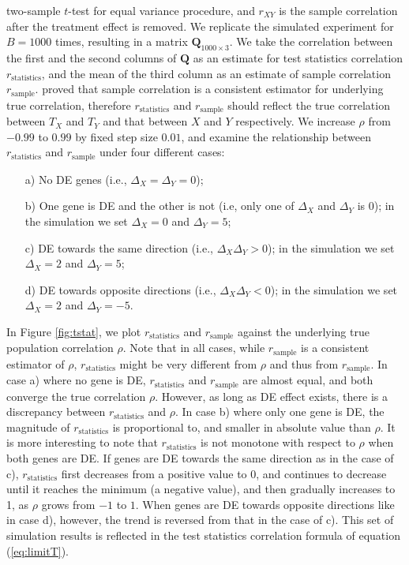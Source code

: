 \documentclass[12pt, a4paper]{article}
\begin{document}
	two-sample $t$-test for equal variance procedure, and $r_{XY}$ is the sample correlation after the treatment effect is removed. We replicate the simulated
	experiment for $B=1000$ times, resulting in a matrix $\bm Q_{1000\times 3}$. We take the correlation between the first and the second columns of $\bm Q$ as an estimate for test statistics correlation	$r_\text{statistics}$, and 
	the mean of the third column as an estimate of sample correlation $r_{\text{sample}}$. 
	\citet{fisher1915frequency} proved that sample correlation is a consistent estimator for underlying true 
	correlation, therefore
		$r_\text{statistics}$ and $r_{\text{sample}}$ should reflect the true correlation between $T_X$ and $T_Y$ and 
		that between $X$ and $Y$ respectively. 
		We increase $\rho$ from $-0.99$ to $0.99$ by fixed step size $0.01$, and examine the relationship between $r_\text{statistics}$ and $r_{\text{sample}}$ under four different cases:
	\begin{enumerate}
		\item[a)] No DE genes (i.e., $\Delta_X = \Delta_Y  =0$);
		\item[b)] One gene is DE and the other is not (i.e, only one of $\Delta_X$ and $\Delta_Y$ is 0); in the simulation we set $\Delta_X = 0$ and $\Delta_Y=5$;
		\item[c)] DE towards the same direction (i.e., $\Delta_X\Delta_Y>0$); in the simulation we set $\Delta_X = 2$ and $\Delta_Y=5$;
		\item[d)] DE towards opposite directions (i.e., $\Delta_X\Delta_Y <0$); in the simulation we set $\Delta_X = 2$ and $\Delta_Y=-5$.
		\end{enumerate}
		
	In Figure \ref{fig:tstat}, we plot $r_\text{statistics}$ and $r_{\text{sample}}$ against the underlying true population correlation $\rho$. Note that in all cases, while $r_{\text{sample}}$ is a consistent estimator of $\rho$, $r_\text{statistics}$ might be very different from $\rho$ and thus from $r_\text{sample}$.  
	In case a) where no gene is DE, $r_\text{statistics}$ and $r_{\text{sample}}$ are almost equal, and both converge the true correlation $\rho$. However, as long as DE effect exists, there is a discrepancy between $r_\text{statistics}$ and $\rho$. In case b) where only one gene is DE, 
	 the magnitude of $r_\text{statistics}$ is proportional to, and smaller in absolute value than $\rho$.
	It is more interesting to note that $r_\text{statistics}$ is not monotone with respect to $\rho$ when both genes are DE. If genes are DE towards the same direction as in the case of c),  $r_\text{statistics}$ first decreases from a positive value to 0, and continues to decrease until it reaches the minimum (a negative value), and then gradually increases to 1, as $\rho$ grows from $-1$ to $1$. When genes are DE towards opposite directions like in case d), however, the trend is reversed from that in the case of c).	This set of simulation results is reflected in the test statistics correlation formula of equation (\ref{eq:limitT}). 
	
\end{document}
